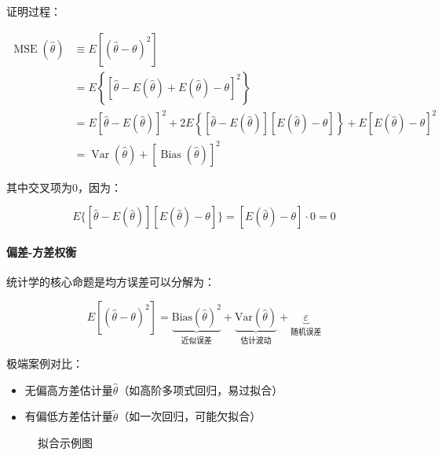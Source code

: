\begin{flushleft}
证明过程：
\end{flushleft}
\begin{equation}
	\begin{split}
		\operatorname{MSE}(\hat{\theta})&\equiv E\left[(\hat{\theta}-\theta)^{2}\right]\\
		&=E\left\{[\hat{\theta}-E(\hat{\theta})+E(\hat{\theta})-\theta]^{2}\right\} \\
		&=E\left[\hat{\theta}-E(\hat{\theta})\right]^{2}+2E\left\{[\hat{\theta}-E(\hat{\theta})][E(\hat{\theta})-\theta]\right\}+E[E(\hat{\theta})-\theta]^{2} \\
		&=\operatorname{Var}(\hat{\theta})+[\operatorname{Bias}(\hat{\theta})]^{2}
	\end{split}
\end{equation}

\begin{flushleft}
其中交叉项为0，因为：
\end{flushleft}
\begin{equation}
	E\{[\hat{\theta}-E(\hat{\theta})][E(\hat{\theta})-\theta]\}=[E(\hat{\theta})-\theta]\cdot 0=0 
\end{equation}

\paragraph*{偏差-方差权衡}
\begin{flushleft}
统计学的核心命题是均方误差可以分解为：
\end{flushleft}
\begin{equation}
	E\left[(\hat{\theta}-\theta)^{2}\right] = \underbrace{\mathrm{Bias}(\hat{\theta})^2}_{\text{近似误差}} + \underbrace{\mathrm{Var}(\hat{\theta})}_{\text{估计波动}} + \underbrace{\varepsilon}_{\text{随机误差}}
\end{equation}

\begin{flushleft}
极端案例对比：
\end{flushleft}
\begin{itemize}
	\item 无偏高方差估计量$\hat{\theta}$（如高阶多项式回归，易过拟合）
	\item 有偏低方差估计量$\tilde{\theta}$（如一次回归，可能欠拟合）
\end{itemize}

\begin{figure}[ht]
	\centering
	\caption{拟合示例图}
\end{figure}

